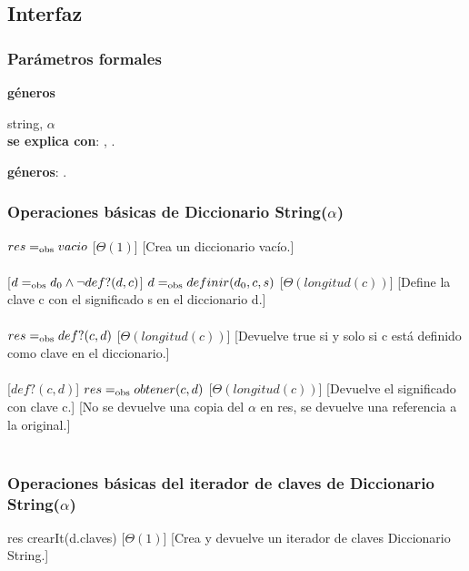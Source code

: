 \subsection{Interfaz}

  \subsubsection{Par\'ametros formales}
   \parbox{1.7cm}{\textbf{g\'eneros}} string, $\alpha$\\

  \textbf{se explica con}: , .

  \textbf{g\'eneros}: . %

  \subsubsection{Operaciones b\'asicas de Diccionario String($\alpha$)}
  {$res =_{\mathrm{obs}} vacio$}%
  [$\Theta(1)$]
  [Crea un diccionario vac\'io.]\\\\
  [$d =_{\mathrm{obs}} d_0 \wedge \neg def?(d,c)$]
  {$d =_{\mathrm{obs}} definir(d_0,c,s)$}%
  [$\Theta(longitud(c))$]
  [Define la clave c con el significado s en el diccionario d.]\\\\
  {$res =_{\mathrm{obs}} def?(c,d)$}%
  [$\Theta(longitud(c))$]
  [Devuelve true si y solo si c est\'a definido como clave en el diccionario.]\\\\
  [$def?(c,d)$]
  {$res =_{\mathrm{obs}} obtener(c,d)$}%
  [$\Theta(longitud(c))$]
  [Devuelve el significado con clave c.]
  [No se devuelve una copia del $\alpha$ en res, se devuelve una referencia a la original.]\\\\

 \subsubsection{Operaciones b\'asicas del iterador de claves de Diccionario String($\alpha$)}
  {res \igobs crearIt(d.claves) }
  [$\Theta(1)$]
  [Crea y devuelve un iterador de claves Diccionario String.]\\\\


